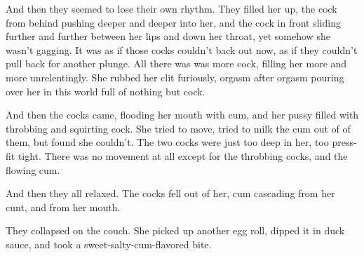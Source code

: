 \documentclass[letterpaper]{article}
\begin{document}
And then they seemed to lose their own rhythm.
They filled her up, the cock from behind pushing deeper and deeper into her, and the cock in front sliding further and further between her lips and down her throat, yet somehow she wasn't gagging.
It was as if those cocks couldn't back out now, as if they couldn't pull back for another plunge.
All there was was more cock, filling her more and more unrelentingly.
She rubbed her clit furiously, orgasm after orgasm pouring over her in this world full of nothing but cock.

And then the cocks came, flooding her mouth with cum, and her pussy filled with throbbing and squirting cock.
She tried to move, tried to milk the cum out of of them, but found she couldn't.
The two cocks were just too deep in her, too press-fit tight. There was no movement at all except for the throbbing cocks, and the flowing cum.

And then they all relaxed. The cocks fell out of her, cum cascading from her cunt, and from her mouth.

They collapsed on the couch.
She picked up another egg roll, dipped it in duck sauce, and took a sweet-salty-cum-flavored bite.





\end{document}
